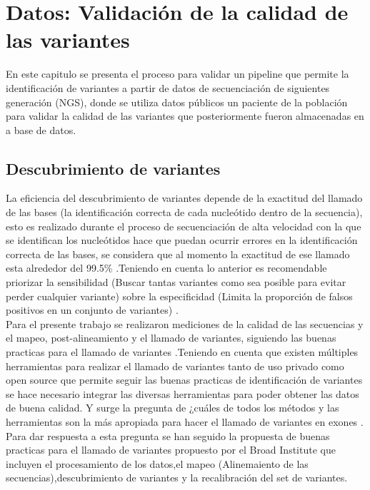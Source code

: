 \chapter{Datos: Validación de la calidad de las variantes}

En este capitulo se presenta el proceso para validar un pipeline que permite la  identificación de variantes a partir de datos de secuenciación de siguientes generación (NGS), donde se utiliza datos públicos un paciente de la población para validar la calidad  de las variantes que posteriormente fueron almacenadas en a base de datos.

\section{Descubrimiento de variantes}

La eficiencia del descubrimiento de variantes depende de la exactitud del llamado de las bases (la identificación correcta de cada nucleótido dentro de la secuencia), esto es realizado durante el proceso de secuenciación de alta velocidad con la que se identifican los nucleótidos hace que puedan ocurrir errores en la identificación correcta de las bases, se considera que al momento la exactitud de ese llamado esta alrededor del 99.5\% \cite{Tetreault2015}.Teniendo en cuenta lo anterior es recomendable  priorizar la sensibilidad (Buscar tantas variantes como sea posible para evitar perder cualquier variante) sobre la especificidad (Limita la proporción de falsos positivos en un conjunto de variantes) \cite{Auwera2014}.  \\

Para el presente trabajo se realizaron mediciones de la calidad de las secuencias y el mapeo, post-alineamiento y el llamado de variantes, siguiendo las buenas practicas para el llamado de variantes \cite{Fisch2015}.Teniendo en cuenta que existen múltiples herramientas para realizar el llamado de variantes tanto de uso privado como open source que permite  seguir las buenas practicas de identificación de variantes se hace necesario integrar las diversas herramientas para poder obtener las datos de buena calidad. Y surge la pregunta de ¿cuáles de todos los métodos y las herramientas son la más apropiada para hacer el llamado de variantes en exones \cite{Bao2014}\cite{Cornish2015}.\\

Para dar respuesta a esta pregunta se han seguido la propuesta de buenas practicas para el llamado de variantes propuesto por el Broad Institute que incluyen el procesamiento de los datos,el mapeo (Alinemaiento de las secuencias),descubrimiento de variantes y la recalibración del set de variantes.

